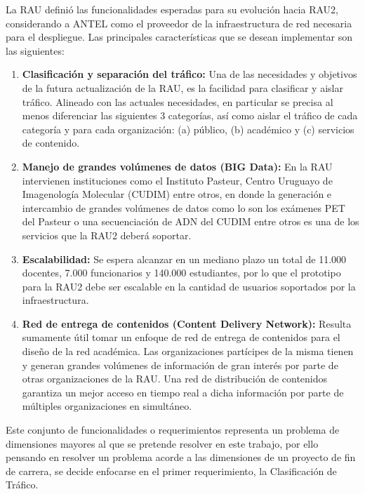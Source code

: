 La RAU definió las funcionalidades esperadas para su evolución hacia RAU2, considerando a ANTEL como el proveedor de la infraestructura de red necesaria para el despliegue. Las principales características que se desean implementar son las siguientes:


\begin{enumerate}
\item \textbf{Clasificación y separación del tráfico:} Una de las necesidades y objetivos de la futura actualizaci\'on de la RAU, es la facilidad para clasificar y aislar tráfico. Alineado con las actuales necesidades, en particular se precisa al menos diferenciar las siguientes 3 categorías, as\'i como aislar el tr\'afico de cada categoría y para cada organizaci\'on: (a) público, (b) académico y (c) servicios de contenido.

\item \textbf{Manejo de grandes volúmenes de datos (BIG Data):} En la RAU intervienen instituciones como el Instituto Pasteur, Centro Uruguayo de Imagenología Molecular (CUDIM) entre otros, en donde la generación e intercambio de grandes volúmenes de datos como lo son los exámenes PET del Pasteur o una secuenciación de ADN del CUDIM entre otros es una de los servicios que la RAU2 deber\'a soportar.

\item \textbf{Escalabilidad:} Se espera alcanzar en un mediano plazo un total de 11.000 docentes, 7.000 funcionarios y 140.000 estudiantes, por lo que el prototipo para la RAU2 debe ser escalable en la cantidad de usuarios soportados por la infraestructura.

\item \textbf{Red de entrega de contenidos (Content Delivery Network):} Resulta sumamente útil tomar un enfoque de red de entrega de contenidos para el diseño de la red académica. Las organizaciones partícipes de la misma tienen y generan grandes volúmenes de información de gran interés por parte de otras organizaciones de la RAU. Una red de distribución de contenidos garantiza un mejor acceso en tiempo real a dicha información por parte de múltiples organizaciones en simultáneo. 
 
\end{enumerate}

Este conjunto de funcionalidades o requerimientos representa un problema de dimensiones mayores al que se pretende resolver en este trabajo, por ello pensando en resolver un problema acorde a las dimensiones de un proyecto de fin de carrera, se decide enfocarse en el primer requerimiento, la Clasificación de Tr\'afico.

